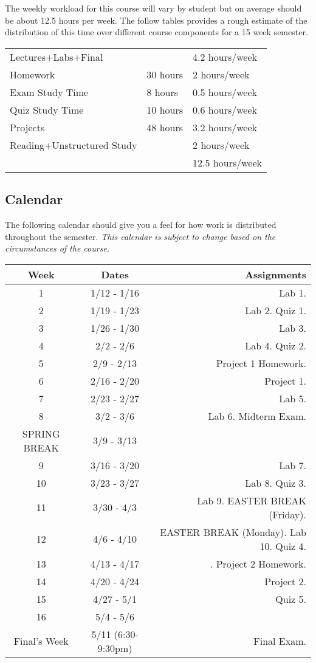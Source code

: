 \documentclass[10pt]{article}
\begin{document}
The weekly workload for this course will vary by student but on average should be about 12.5 hours per week.  The follow tables provides a rough estimate of the distribution of this time over different course components for a 15 week semester. 
\begin{center}
\begin{tabular}{|l|l|l|}
\hline
Lectures+Labs+Final &      & 4.2 hours/week \\ 
Homework & 30 hours        & 2 hours/week \\
Exam Study Time & 8 hours  & 0.5 hours/week \\ 
Quiz Study Time & 10 hours & 0.6 hours/week \\
Projects & 48 hours        & 3.2 hours/week \\
Reading+Unstructured Study & & 2 hours/week \\
\hline 
& & 12.5 hours/week \\ 
\hline
\end{tabular}
\end{center}


\subsection{Calendar}

The following calendar should give you a feel for how work is distributed throughout the semester.  \textit{This calendar is subject to change based on the circumstances of the course.}
\begin{center}
\begin{tabular}{|c|c|r|}
\hline 
Week & Dates & Assignments \\
\hline
1 & 1/12 - 1/16 &  Lab 1.\\
\hline
2 & 1/19 - 1/23 & Lab 2.  Quiz 1.\\
\hline
3 & 1/26 - 1/30 & Lab 3.  \\
\hline
4 & 2/2 - 2/6 & Lab 4. Quiz 2.  \\
\hline
5 & 2/9 - 2/13 & Project 1 Homework. \\
\hline
6 & 2/16 - 2/20 & Project 1. \\
\hline
7 & 2/23 - 2/27 & Lab 5.  \\
\hline
8 & 3/2 - 3/6 & Lab 6. Midterm Exam.  \\
\hline 
SPRING BREAK & 3/9 - 3/13 &  \\
\hline
9 & 3/16 - 3/20 & Lab 7. \\
\hline
10 & 3/23 - 3/27 & Lab 8.  Quiz 3. \\
\hline
11 & 3/30 - 4/3 & Lab 9. EASTER BREAK (Friday).\\
\hline
12 & 4/6 - 4/10 & EASTER BREAK (Monday). Lab 10. Quiz 4. \\
\hline
13 & 4/13 - 4/17 &  . Project 2 Homework. \\
\hline
14 & 4/20 - 4/24 &  Project 2. \\
\hline
15 & 4/27 - 5/1 & Quiz 5. \\ 
\hline
16 & 5/4 - 5/6 & \\
\hline
Final's Week & 5/11 (6:30-9:30pm) & Final Exam. \\ 
\hline
\end{tabular}
\end{center}
\end{document}
